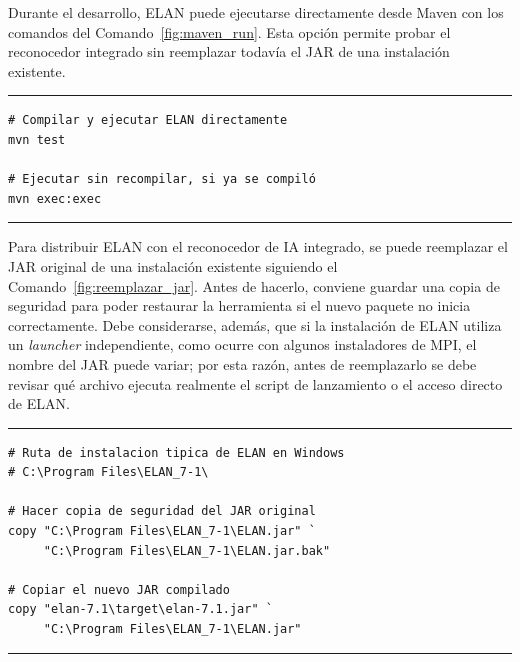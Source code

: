\documentclass[11pt,a4paper]{article}
\begin{document}
Durante el desarrollo, ELAN puede ejecutarse directamente desde Maven con los comandos del Comando~\ref{fig:maven_run}. Esta opción permite probar el reconocedor integrado sin reemplazar todavía el JAR de una instalación existente.

\begin{center}
\begin{minipage}{0.74\textwidth}
\hrule
\vspace{0.06cm}
\scriptsize
\begin{Verbatim}[baselinestretch=0.72]
# Compilar y ejecutar ELAN directamente
mvn test

# Ejecutar sin recompilar, si ya se compiló
mvn exec:exec
\end{Verbatim}
\vspace{0.03cm}
\hrule

\label{fig:maven_run}
\end{minipage}
\end{center}

Para distribuir ELAN con el reconocedor de IA integrado, se puede reemplazar el JAR original de una instalación existente siguiendo el Comando~\ref{fig:reemplazar_jar}. Antes de hacerlo, conviene guardar una copia de seguridad para poder restaurar la herramienta si el nuevo paquete no inicia correctamente. Debe considerarse, además, que si la instalación de ELAN utiliza un \textit{launcher} independiente, como ocurre con algunos instaladores de MPI, el nombre del JAR puede variar; por esta razón, antes de reemplazarlo se debe revisar qué archivo ejecuta realmente el script de lanzamiento o el acceso directo de ELAN.

\begin{center}
\begin{minipage}{0.92\textwidth}
\hrule
\vspace{0.06cm}
\scriptsize
\begin{Verbatim}[baselinestretch=0.72]
# Ruta de instalacion tipica de ELAN en Windows
# C:\Program Files\ELAN_7-1\

# Hacer copia de seguridad del JAR original
copy "C:\Program Files\ELAN_7-1\ELAN.jar" `
     "C:\Program Files\ELAN_7-1\ELAN.jar.bak"

# Copiar el nuevo JAR compilado
copy "elan-7.1\target\elan-7.1.jar" `
     "C:\Program Files\ELAN_7-1\ELAN.jar"
\end{Verbatim}
\vspace{0.03cm}
\hrule

\label{fig:reemplazar_jar}
\end{minipage}
\end{center}
\end{document}

